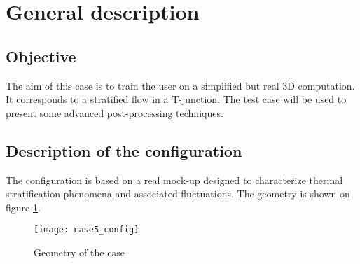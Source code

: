 
%
%
%
%


\section{General description}

        \subsection{Objective}

The aim of this case is to train the \CS user on a simplified but real 3D
computation. It corresponds to a stratified flow in a T-junction. The test case
will be used to present some advanced post-processing techniques.


        \subsection{Description of the configuration}

The configuration is based on a real mock-up designed to characterize thermal
stratification phenomena and associated fluctuations. The geometry is shown on
figure \ref{config}.


\begin{figure}[h!]
\begin{center}
\texttt{[image: case5\_config]}
\caption{Geometry of the case}
\label{config}
\end{center}
\end{figure}

